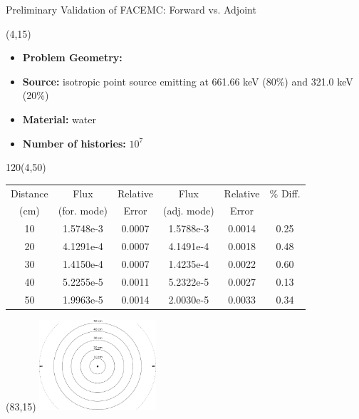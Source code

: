 \documentclass{beamer}
\begin{document}
\begin{frame}{Preliminary Validation of FACEMC: Forward vs. Adjoint}

  \begin{textblock}{80}(4,15)
    \begin{itemize}
      \item \textbf{Problem Geometry:} 
      \item \textbf{Source:} isotropic point source emitting at 661.66 keV 
        (80\%) and 321.0 keV (20\%)
      \item \textbf{Material:} water
      \item \textbf{Number of histories:} $10^7$
    \end{itemize}
\end{textblock}
  
  \begin{textblock}{120}(4,50)
    \begin{table}[ht]
      \centering
      \begin{tabular}{c c c c c c}
        \hline\hline
        Distance & Flux & Relative & Flux & Relative & \% Diff. \\ 
        (cm) & (for. mode) & Error & (adj. mode) & Error &  \\ [0.5ex]
        \hline
        10 & 1.5748e-3 & 0.0007 & 1.5788e-3 & 0.0014 & 0.25 \\
        20 & 4.1291e-4 & 0.0007 & 4.1491e-4 & 0.0018 & 0.48 \\
        30 & 1.4150e-4 & 0.0007 & 1.4235e-4 & 0.0022 & 0.60 \\
        40 & 5.2255e-5 & 0.0011 & 5.2322e-5 & 0.0027 & 0.13 \\
        50 & 1.9963e-5 & 0.0014 & 2.0030e-5 & 0.0033 & 0.34 \\ [1ex]
        \hline
      \end{tabular}
    \end{table}   
  \end{textblock}

  \begin{textblock}{20}(83,15)
    \includegraphics[width=1.7in]{figures/code_comparison_problem.pdf}
  \end{textblock}    

\end{frame}
\end{document}
